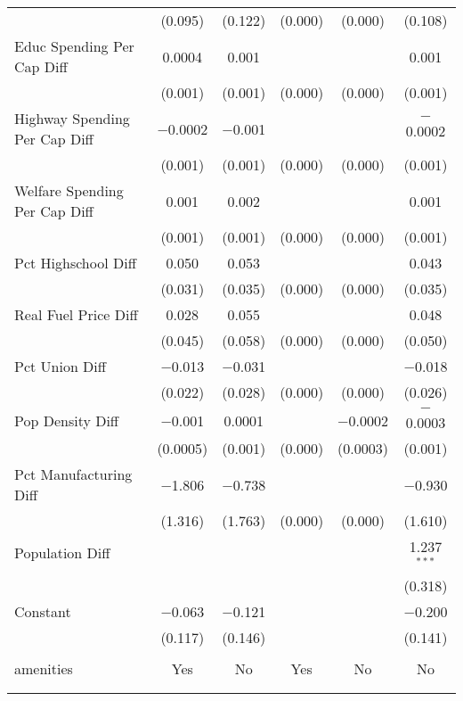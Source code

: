 \begin{table}[!htbp]
\begin{tabular}{@{\extracolsep{5pt}}lccccc}
  & (0.095) & (0.122) & (0.000) & (0.000) & (0.108) \\ 
  Educ Spending Per Cap Diff & 0.0004 & 0.001 &  &  & 0.001 \\ 
  & (0.001) & (0.001) & (0.000) & (0.000) & (0.001) \\ 
  Highway Spending Per Cap Diff & $-$0.0002 & $-$0.001 &  &  & $-$0.0002 \\ 
  & (0.001) & (0.001) & (0.000) & (0.000) & (0.001) \\ 
  Welfare Spending Per Cap Diff & 0.001 & 0.002 &  &  & 0.001 \\ 
  & (0.001) & (0.001) & (0.000) & (0.000) & (0.001) \\ 
  Pct Highschool Diff & 0.050 & 0.053 &  &  & 0.043 \\ 
  & (0.031) & (0.035) & (0.000) & (0.000) & (0.035) \\ 
  Real Fuel Price Diff & 0.028 & 0.055 &  &  & 0.048 \\ 
  & (0.045) & (0.058) & (0.000) & (0.000) & (0.050) \\ 
  Pct Union Diff & $-$0.013 & $-$0.031 &  &  & $-$0.018 \\ 
  & (0.022) & (0.028) & (0.000) & (0.000) & (0.026) \\ 
  Pop Density Diff & $-$0.001 & 0.0001 &  & $-$0.0002 & $-$0.0003 \\ 
  & (0.0005) & (0.001) & (0.000) & (0.0003) & (0.001) \\ 
  Pct Manufacturing Diff & $-$1.806 & $-$0.738 &  &  & $-$0.930 \\ 
  & (1.316) & (1.763) & (0.000) & (0.000) & (1.610) \\ 
  Population Diff &  &  &  &  & 1.237$^{***}$ \\ 
  &  &  &  &  & (0.318) \\ 
  Constant & $-$0.063 & $-$0.121 &  &  & $-$0.200 \\ 
  & (0.117) & (0.146) &  &  & (0.141) \\ 
 \hline \\[-1.8ex] 
amenities & Yes & No & Yes & No & No \\ 
\hline \\[-1.8ex] 
\hline 
\hline \\[-1.8ex] 
\end{tabular} 
\end{table} 
